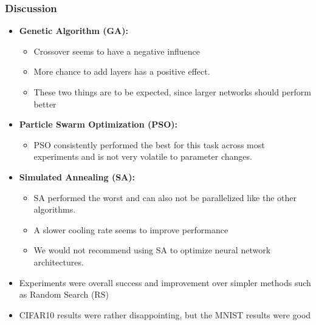 \documentclass{beamer}
\begin{document}
    \begin{frame}
        \frametitle{Discussion}
        \begin{itemize}
            \item \textbf{Genetic Algorithm (GA):}
            \begin{itemize}
                \item Crossover seems to have a negative influence
                \item More chance to add layers has a positive effect. 
                \item These two things are to be expected, since larger networks should perform better
            \end{itemize}
            \item \textbf{Particle Swarm Optimization (PSO):}
            \begin{itemize}
                \item PSO consistently performed the best for this task across most experiments and is not very volatile to parameter changes.
            \end{itemize}
            \item \textbf{Simulated Annealing (SA):}
            \begin{itemize}
                \item SA performed the worst and can also not be parallelized like the other algorithms.
                \item A slower cooling rate seems to improve performance
                \item We would not recommend using SA to optimize neural network architectures.
            \end{itemize}
            \item Experiments were overall success and improvement over simpler methods such as Random Search (RS)
            \item CIFAR10 results were rather disappointing, but the MNIST results were good
        \end{itemize}
    \end{frame}
\end{document}

